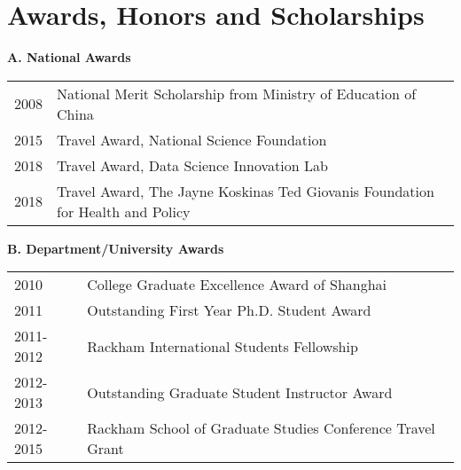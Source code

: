 \documentclass[10pt]{article}
\begin{document}
%
%



\section*{Awards, Honors and Scholarships}

\textbf{A. National Awards}

\begin{table}[H]
\hskip0.9cm\begin{tabular}{p{1.6cm}p{12cm}}
2008 & National Merit Scholarship from Ministry of Education of China  \\
2015 & Travel Award, National Science Foundation \\
2018 & Travel Award, Data Science Innovation Lab \\
2018 & Travel Award, The Jayne Koskinas Ted Giovanis Foundation for Health and Policy
\end{tabular}
\end{table}

\textbf{B. Department/University Awards}
\begin{table}[H]
\hskip0.9cm\begin{tabular}{p{1.6cm}p{12cm}}
2010 & College Graduate Excellence Award of Shanghai  \\
2011 & Outstanding First Year Ph.D. Student Award \\
2011-2012 & Rackham International Students Fellowship \\
2012-2013 & Outstanding Graduate Student Instructor Award\\
2012-2015 & Rackham School of Graduate Studies Conference Travel Grant
\end{tabular}
\end{table}
\end{document}
